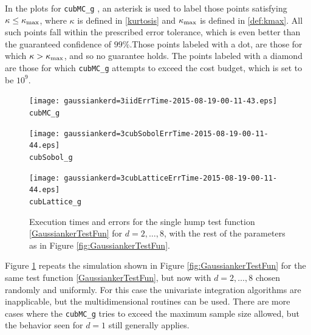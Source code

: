 \documentclass{iitthesis}
\theoremstyle{definition}
\begin{document}
In the plots for {\tt cubMC\_g} , an asterisk is used to label those points satisfying $\kappa \le \kappa_{\max}$, where $\kappa$ is defined in \eqref{kurtosis} and $\kappa_{\max}$ is defined in \eqref{def:kmax}. All such points fall within the prescribed error tolerance, which is even better than the guaranteed confidence of $99\%$.Those points labeled with a dot, are those for which $\kappa > \kappa_{\max}$, and so no guarantee holds. The points labeled with a diamond are those for which  {\tt cubMC\_g}  attempts to exceed the cost budget, which is set to be $10^{9}$.

\begin{figure}
\centering
\begin{minipage}{9cm} \centering \texttt{[image: gaussiankerd=3iidErrTime-2015-08-19-00-11-43.eps]} \\ {\tt cubMC\_g}  \end{minipage}
\begin{minipage}{7cm} \centering \texttt{[image: gaussiankerd=3cubSobolErrTime-2015-08-19-00-11-44.eps]} \\  {\tt cubSobol\_g}\end{minipage}
\begin{minipage}{7cm} \centering \texttt{[image: gaussiankerd=3cubLatticeErrTime-2015-08-19-00-11-44.eps]} \\ {\tt cubLattice\_g} \end{minipage}
\caption{Execution times and errors for the single hump test function \eqref{GaussiankerTestFun} for $d=2, \ldots, 8$, with the rest of the parameters as in Figure \ref{fig:GaussiankerTestFun}.\label{fig:GaussiankerHDTestFun} }
\end{figure}

Figure \ref{fig:GaussiankerHDTestFun} repeats the simulation shown in Figure \ref{fig:GaussiankerTestFun} for the same test function \eqref{GaussiankerTestFun}, but now with $d=2, \ldots, 8$ chosen randomly and uniformly.  For this case the univariate integration algorithms are inapplicable, but the multidimensional routines can be used.  There are more cases where the  {\tt cubMC\_g}  tries to exceed the maximum sample size allowed, but the behavior seen for $d=1$ still generally applies.  
\end{document}
